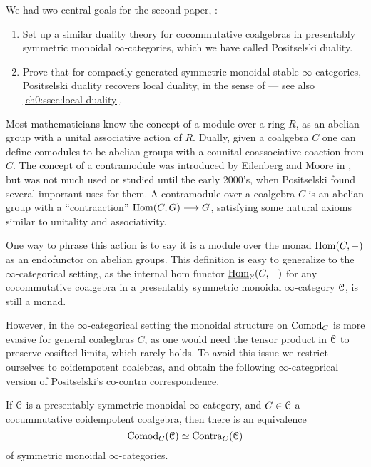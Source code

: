 We had two central goals for the second paper, \cite{aambo_2024_positselski}: 
\begin{enumerate}
    \item Set up a similar duality theory for cocommutative coalgebras in presentably symmetric monoidal $\infty$-categories, which we have called Positselski duality. 
    \item Prove that for compactly generated symmetric monoidal stable $\infty$-categories, Positselski duality recovers local duality, in the sense of \cite{hovey-palmiery-strickland_97} --- see also \cref{ch0:ssec:local-duality}. 
\end{enumerate}

Most mathematicians know the concept of a module over a ring $R$, as an abelian group with a unital associative action of $R$. Dually, given a coalgebra $C$ one can define comodules to be abelian groups with a counital coassociative coaction from $C$. The concept of a contramodule was introduced by Eilenberg and Moore in \cite{eilenberg-moore_65}, but was not much used or studied until the early 2000's, when Positselski found several important uses for them. A contramodule over a coalgebra $C$ is an abelian group with a ``contraaction'' $\operatorname{Hom}(C, G)\longrightarrow G$, satisfying some natural axioms similar to unitality and associativity. 

One way to phrase this action is to say it is a module over the monad $\operatorname{Hom}(C,-)$ as an endofunctor on abelian groups. This definition is easy to generalize to the $\infty$-categorical setting, as the internal hom functor $\operatorname{\underline{Hom}}_{\EuScript{C}}(C,-)$ for any cocommutative coalgebra in a presentably symmetric monoidal $\infty$-category $\EuScript{C}$, is still a monad. 

However, in the $\infty$-categorical setting the monoidal structure on $\mathrm{Comod}_C$ is more evasive for general coalegbras $C$, as one would need the tensor product in $\EuScript{C}$ to preserve cosifted limits, which rarely holds. To avoid this issue we restrict ourselves to coidempotent coalebras, and obtain the following $\infty$-categorical version of Positselski's co-contra correspondence. 

\begin{theorem}
    If $\EuScript{C}$ is a presentably symmetric monoidal $\infty$-category, and $C\in \EuScript{C}$ a cocummutative coidempotent coalgebra, then there is an equivalence 
    \[\mathrm{Comod}_C(\EuScript{C})\simeq \mathrm{Contra}_C(\EuScript{C})\]
    of symmetric monoidal $\infty$-categories. 
\end{theorem}

